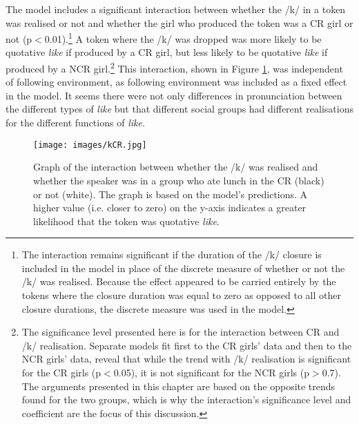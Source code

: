 The model includes a significant interaction between whether the /k/ in a token was realised or not and whether the girl who produced the token was a CR girl or not (p$<$0.01).\footnote{The interaction remains significant if the duration of the /k/ closure is included in the model in place of the discrete measure of whether or not the /k/ was realised.  Because the effect appeared to be carried entirely by the tokens where the closure duration was equal to zero as opposed to all other closure durations, the discrete measure was used in the model.}  A token where the /k/ was dropped was more likely to be quotative \textit{like} if produced by a CR girl, but less likely to be quotative \textit{like} if produced by a NCR girl.\footnote{The significance level presented here is for the interaction between CR and /k/ realisation.  Separate models fit first to the CR girls' data and then to the NCR girls' data, reveal that while the trend with /k/ realisation is significant for the CR girls (p$<$0.05), it is not significant for the NCR girls (p$>$0.7).  The arguments presented in this chapter are based on the opposite trends found for the two groups, which is why the interaction's significance level and coefficient are the focus of this discussion.}  This interaction, shown in Figure \ref{fig:kCR-qdp}, was independent of following environment, as following environment was included as a fixed effect in the model.  It seems there were not only differences in pronunciation between the different types of \textit{like} but that different social groups had different realisations for the different functions of \textit{like}.  


\begin{figure}
	\centering
		\texttt{[image: images/kCR.jpg]}
	\caption{Graph of the interaction between whether the /k/ was realised and whether the speaker was in a group who ate lunch in the CR (black) or not (white).  The graph is based on the model's predictions.  A higher value (i.e. closer to zero) on the y-axis indicates a greater likelihood that the token was quotative \textit{like}.}
	\label{fig:kCR-qdp}
\end{figure}





